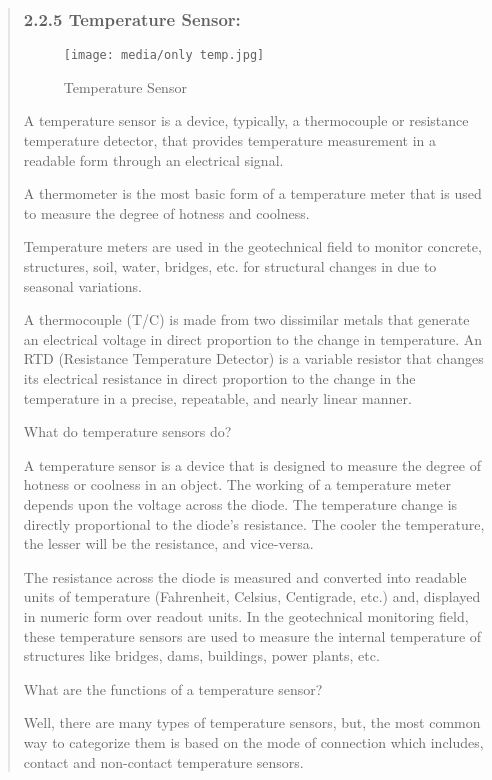 \documentclass[12pt]{report}
\begin{document}
				
				\begin{quote}
					\subsubsection{2.2.5  Temperature Sensor:}
					\begin{figure}
						\centering
						\texttt{[image: media/only temp.jpg]}\\
						\caption{Temperature Sensor}
					\end{figure}
					A temperature sensor is a device, typically, a thermocouple or resistance temperature detector, that provides temperature measurement in a readable form through an electrical signal.
					
					A thermometer is the most basic form of a temperature meter that is used to measure the degree of hotness and coolness.
					
					Temperature meters are used in the geotechnical field to monitor concrete, structures, soil, water, bridges, etc. for structural changes in due to seasonal variations.
					
					A thermocouple (T/C) is made from two dissimilar metals that generate an electrical voltage in direct proportion to the change in temperature. An RTD (Resistance Temperature Detector) is a variable resistor that changes its electrical resistance in direct proportion to the change in the temperature in a precise, repeatable, and nearly linear manner.
					
					
					What do temperature sensors do?
					
					A temperature sensor is a device that is designed to measure the degree of hotness or coolness in an object. The working of a temperature meter depends upon the voltage across the diode. The temperature change is directly proportional to the diode’s resistance. The cooler the temperature, the lesser will be the resistance, and vice-versa.
					
					The resistance across the diode is measured and converted into readable units of temperature (Fahrenheit, Celsius, Centigrade, etc.) and, displayed in numeric form over readout units. In the geotechnical monitoring field, these temperature sensors are used to measure the internal temperature of structures like bridges, dams, buildings, power plants, etc.
					
					
					What are the functions of a temperature sensor?
					
					Well, there are many types of temperature sensors, but, the most common way to categorize them is based on the mode of connection which includes, contact and non-contact temperature sensors.
					

\end{quote}
\end{document}
